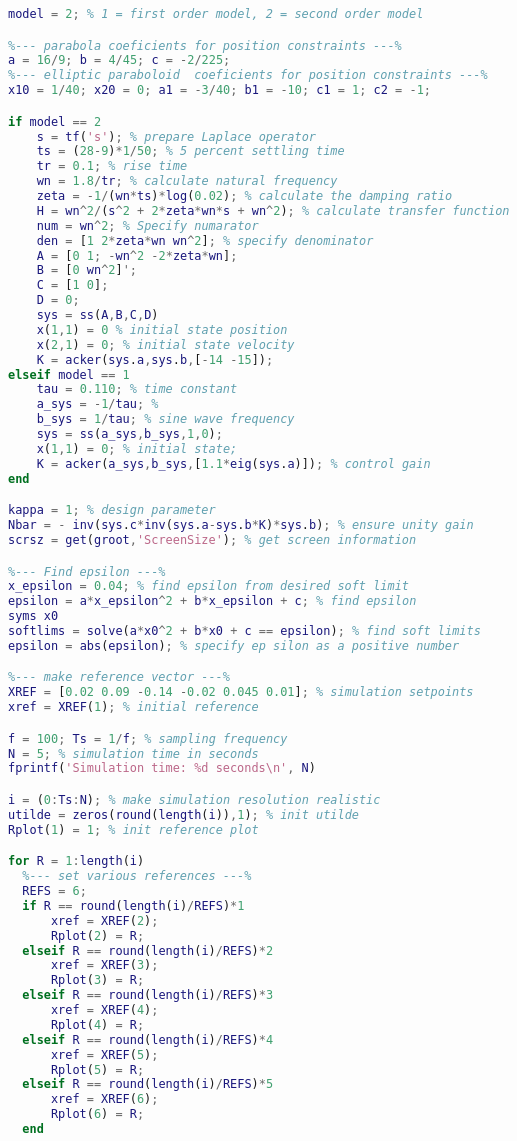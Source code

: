 \begin{lstlisting}[language=matlab]
model = 2; % 1 = first order model, 2 = second order model

%--- parabola coeficients for position constraints ---%
a = 16/9; b = 4/45; c = -2/225; 
%--- elliptic paraboloid  coeficients for position constraints ---%
x10 = 1/40; x20 = 0; a1 = -3/40; b1 = -10; c1 = 1; c2 = -1;

if model == 2
    s = tf('s'); % prepare Laplace operator
    ts = (28-9)*1/50; % 5 percent settling time
    tr = 0.1; % rise time
    wn = 1.8/tr; % calculate natural frequency
    zeta = -1/(wn*ts)*log(0.02); % calculate the damping ratio
    H = wn^2/(s^2 + 2*zeta*wn*s + wn^2); % calculate transfer function
    num = wn^2; % Specify numarator
    den = [1 2*zeta*wn wn^2]; % specify denominator
    A = [0 1; -wn^2 -2*zeta*wn];
    B = [0 wn^2]';
    C = [1 0];
    D = 0;
    sys = ss(A,B,C,D)
    x(1,1) = 0 % initial state position
    x(2,1) = 0; % initial state velocity
    K = acker(sys.a,sys.b,[-14 -15]);
elseif model == 1
    tau = 0.110; % time constant
    a_sys = -1/tau; %
    b_sys = 1/tau; % sine wave frequency
    sys = ss(a_sys,b_sys,1,0);
    x(1,1) = 0; % initial state;
    K = acker(a_sys,b_sys,[1.1*eig(sys.a)]); % control gain   
end

kappa = 1; % design parameter
Nbar = - inv(sys.c*inv(sys.a-sys.b*K)*sys.b); % ensure unity gain
scrsz = get(groot,'ScreenSize'); % get screen information

%--- Find epsilon ---%
x_epsilon = 0.04; % find epsilon from desired soft limit
epsilon = a*x_epsilon^2 + b*x_epsilon + c; % find epsilon
syms x0
softlims = solve(a*x0^2 + b*x0 + c == epsilon); % find soft limits
epsilon = abs(epsilon); % specify ep silon as a positive number

%--- make reference vector ---%
XREF = [0.02 0.09 -0.14 -0.02 0.045 0.01]; % simulation setpoints
xref = XREF(1); % initial reference

f = 100; Ts = 1/f; % sampling frequency
N = 5; % simulation time in seconds
fprintf('Simulation time: %d seconds\n', N)

i = (0:Ts:N); % make simulation resolution realistic
utilde = zeros(round(length(i)),1); % init utilde
Rplot(1) = 1; % init reference plot

for R = 1:length(i)
  %--- set various references ---%
  REFS = 6;
  if R == round(length(i)/REFS)*1
      xref = XREF(2);
      Rplot(2) = R;
  elseif R == round(length(i)/REFS)*2
      xref = XREF(3);
      Rplot(3) = R;
  elseif R == round(length(i)/REFS)*3
      xref = XREF(4);
      Rplot(4) = R;
  elseif R == round(length(i)/REFS)*4
      xref = XREF(5);
      Rplot(5) = R;
  elseif R == round(length(i)/REFS)*5
      xref = XREF(6);
      Rplot(6) = R;
  end
  

\end{lstlisting}
